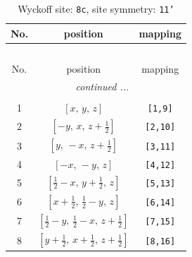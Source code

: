\documentclass[fleqn,8pt]{jsarticle}
\begin{document}
\renewcommand{\arraystretch}{1.2}
\begin{longtable}{ccc}
\caption{Wyckoff site: {\tt 8c}, site symmetry: {\tt 11'}}
 \\
 \hline \hline
No. & position & mapping \\ \hline \endfirsthead

\multicolumn{2}{l}{\tablename\ \thetable{}} \\
 \hline \hline
No. & position & mapping \\ \hline \endhead

 \hline \hline
\multicolumn{2}{r}{\footnotesize\it continued ...} \\ \endfoot

 \hline \hline
\multicolumn{2}{r}{} \\ \endlastfoot

1 & $\left[ x,\, y,\, z \right]$ & {\tt [1,9]} \\ \hline
2 & $\left[ - y,\, x,\, z + \frac{1}{2} \right]$ & {\tt [2,10]} \\ \hline
3 & $\left[ y,\, - x,\, z + \frac{1}{2} \right]$ & {\tt [3,11]} \\ \hline
4 & $\left[ - x,\, - y,\, z \right]$ & {\tt [4,12]} \\ \hline
5 & $\left[ \frac{1}{2} - x,\, y + \frac{1}{2},\, z \right]$ & {\tt [5,13]} \\ \hline
6 & $\left[ x + \frac{1}{2},\, \frac{1}{2} - y,\, z \right]$ & {\tt [6,14]} \\ \hline
7 & $\left[ \frac{1}{2} - y,\, \frac{1}{2} - x,\, z + \frac{1}{2} \right]$ & {\tt [7,15]} \\ \hline
8 & $\left[ y + \frac{1}{2},\, x + \frac{1}{2},\, z + \frac{1}{2} \right]$ & {\tt [8,16]} \\
\end{longtable}
\end{document}
